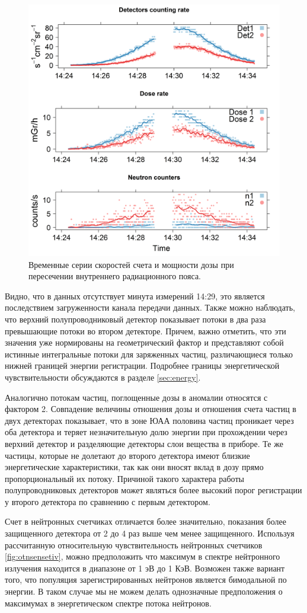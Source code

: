 \begin{figure}
	\centering
	\includegraphics[width=0.5\linewidth]{images/results/depron_sec_log_new08-29-1614-24-23}
	\caption{Временные серии скоростей счета и мощности дозы при пересечении внутреннего радиационного пояса. }	\label{fig:depronseclognew08-29-1614-24-23}
\end{figure}

Видно, что в данных отсутствует минута измерений 14:29, это является последствием загруженности канала передачи данных. Также можно наблюдать, что верхний полупроводниковый детектор показывает потоки в два раза превышающие потоки во втором детекторе. Причем, важно отметить, что эти значения уже нормированы на геометрический фактор и представляют собой истинные интегральные потоки для заряженных частиц, различающиеся только нижней границей энергии регистрации. Подробнее границы энергетической чувствительности обсуждаются в разделе \ref{sec:energy}.

Аналогично потокам частиц, поглощенные дозы в аномалии относятся с фактором 2. Совпадение величины отношения дозы и отношения счета частиц в двух детекторах показывает, что в зоне ЮАА половина частиц проникает через оба детектора и теряет незначительную долю энергии при прохождении через верхний детектор и разделяющие детекторы слои вещества в приборе. Те же частицы, которые не долетают до второго детектора имеют близкие энергетические характеристики, так как они вносят вклад в дозу прямо пропорциональный их потоку. Причиной такого характера работы полупроводниковых детекторов может являться более высокий порог регистрации у второго детектора по сравнению с первым детектором.

Счет в нейтронных счетчиках отличается более значительно, показания более защищенного детектора от 2 до 4 раз выше чем менее защищенного. Используя рассчитанную относительную чувствительность нейтронных счетчиков \ref{fig:otnsensetiv},  можно предположить что максимум в спектре нейтронного излучения находится в диапазоне от 1 эВ до 1 КэВ.  Возможен также вариант того, что популяция зарегистрированных нейтронов является бимодальной по энергии. В таком случае мы не можем делать однозначные предположения о максимумах в энергетическом спектре потока нейтронов.


